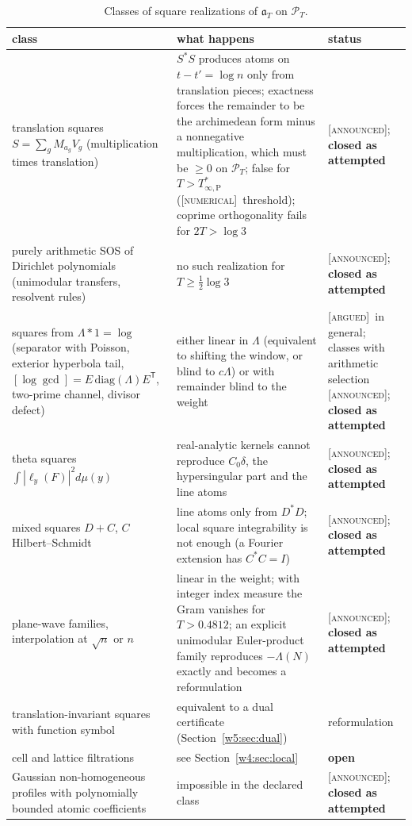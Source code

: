 \documentclass[11pt]{amsart}
\theoremstyle{definition}
\theoremstyle{remark}
\numberwithin{equation}{section}
\newcommand{\PT}{\mathcal{P}_T}                        %
\newcommand{\aT}{\mathfrak{a}_T}                       %
\newcommand{\Tarch}{T^{*}_{\infty,\mathrm P}}          %
\newcommand{\stag}[1]{\textsc{[#1]}}
\newcommand{\ARGUED}{\stag{argued}}
\newcommand{\NUM}{\stag{numerical}}
\newcommand{\ANNOUNCED}{\stag{announced}}
\newcommand{\rtag}[1]{\textbf{\small\textsf{#1}}}
\newcommand{\closedA}{\rtag{closed as attempted}}
\newcommand{\openR}{\rtag{open}}
\begin{document}
\begin{table}[htbp]\centering\small
\caption{Classes of square realizations of $\aT$ on $\PT$.}\label{w4:tab:sos}
\begin{tabular}{@{}p{4.1cm}p{6.3cm}p{3.2cm}@{}}
\toprule
class & what happens & status\\
\midrule
translation squares $S=\sum_gM_{a_g}V_g$ (multiplication times translation) & $S^*S$ produces atoms on $t-t'=\log n$ only from translation pieces; exactness forces the remainder to be the archimedean form minus a nonnegative multiplication, which must be $\ge0$ on $\PT$; false for $T>\Tarch$ (\NUM\ threshold); coprime orthogonality fails for $2T>\log3$ & \ANNOUNCED; \closedA\\
purely arithmetic SOS of Dirichlet polynomials (unimodular transfers, resolvent rules) & no such realization for $T\ge\frac12\log3$ & \ANNOUNCED; \closedA\\
squares from $\Lambda*1=\log$ (separator with Poisson, exterior hyperbola tail, $[\log\gcd]=E\,\mathrm{diag}(\Lambda)E^{\mathsf T}$, two-prime channel, divisor defect) & either linear in $\Lambda$ (equivalent to shifting the window, or blind to $c\Lambda$) or with remainder blind to the weight & \ARGUED\ in general; classes with arithmetic selection \ANNOUNCED; \closedA\\
theta squares $\int|\ell_y(F)|^2d\mu(y)$ & real-analytic kernels cannot reproduce $C_0\delta$, the hypersingular part and the line atoms & \ANNOUNCED; \closedA\\
mixed squares $D+C$, $C$ Hilbert--Schmidt & line atoms only from $D^*D$; local square integrability is not enough (a Fourier extension has $C^*C=I$) & \ANNOUNCED; \closedA\\
plane-wave families, interpolation at $\sqrt n$ or $n$ & linear in the weight; with integer index measure the Gram vanishes for $T>0.4812$; an explicit unimodular Euler-product family reproduces $-\Lambda(N)$ exactly and becomes a reformulation & \ANNOUNCED; \closedA\\
translation-invariant squares with function symbol & equivalent to a dual certificate (Section~\ref{w5:sec:dual}) & reformulation\\
cell and lattice filtrations & see Section~\ref{w4:sec:local} & \openR\\
Gaussian non-homogeneous profiles with polynomially bounded atomic coefficients & impossible in the declared class & \ANNOUNCED; \closedA\\
\bottomrule
\end{tabular}
\end{table}
\end{document}
